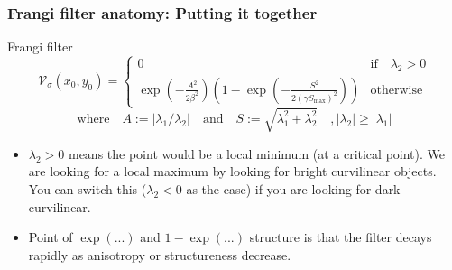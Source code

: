 \documentclass[9pt,notes]{beamer}
\newcommand{\Vsigma}{\ensuremath{\mathcal{V}_{\sigma}}\xspace}
\begin{document}
\begin{frame}
\frametitle{Frangi filter anatomy: Putting it together}
\begin{block}{Frangi filter}
 \begin{equation}
\Vsigma(x_0,y_0) =
\begin{cases}
0 & \text{if} \quad \lambda_2 > 0 \\
\exp\left(-\frac{A^2}{2\beta^2}\right)
\left(1 - \exp\left(-\frac{S^2}{2{(\gamma S_{\max})}^2}\right)\right) & \textrm{otherwise}
\end{cases}
\end{equation}
\begin{equation}
\textrm{where} \quad A := \left|\lambda_1 / \lambda_2\right|
\quad \textrm{and} \quad 
S := \sqrt{\lambda_1^2 + \lambda_2^2}
\quad, \left|\lambda_2\right| \ge \left|\lambda_1\right|
\end{equation}
\end{block}
\begin{itemize}
\item $\lambda_2 > 0$ means the point would be a local minimum (at a critical point). We are looking for a local maximum by looking for bright curvilinear objects. You can switch this ($\lambda_2 < 0$ as the case) if you are looking for dark curvilinear.
\item Point of $\exp(...)$ and $1 - \exp(...)$ structure is that the filter decays rapidly as anisotropy or structureness decrease.
\end{itemize}
\end{frame}
\end{document}
